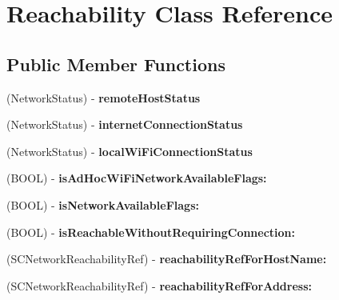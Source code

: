 \hypertarget{interface_reachability}{
\section{Reachability Class Reference}
\label{interface_reachability}
}
\subsection*{Public Member Functions}
\begin{DoxyCompactItemize}
\item 
\hypertarget{interface_reachability_a6ecc8d99fb8ac6789ea6d16142b74dc2}{
(NetworkStatus) -\/ {\bfseries remoteHostStatus}}
\label{interface_reachability_a6ecc8d99fb8ac6789ea6d16142b74dc2}

\item 
\hypertarget{interface_reachability_ad4d2d27655546f497674c0482fcdf2a2}{
(NetworkStatus) -\/ {\bfseries internetConnectionStatus}}
\label{interface_reachability_ad4d2d27655546f497674c0482fcdf2a2}

\item 
\hypertarget{interface_reachability_aac00857972589ed142e782f18b6cc676}{
(NetworkStatus) -\/ {\bfseries localWiFiConnectionStatus}}
\label{interface_reachability_aac00857972589ed142e782f18b6cc676}

\item 
\hypertarget{interface_reachability_a4feb6e656192790a0d940cf77f72033e}{
(BOOL) -\/ {\bfseries isAdHocWiFiNetworkAvailableFlags:}}
\label{interface_reachability_a4feb6e656192790a0d940cf77f72033e}

\item 
\hypertarget{interface_reachability_ac9193b581d1ce2ddbbf963128801c62f}{
(BOOL) -\/ {\bfseries isNetworkAvailableFlags:}}
\label{interface_reachability_ac9193b581d1ce2ddbbf963128801c62f}

\item 
\hypertarget{interface_reachability_a4e1737634c04c4e68c8b47d779a51be8}{
(BOOL) -\/ {\bfseries isReachableWithoutRequiringConnection:}}
\label{interface_reachability_a4e1737634c04c4e68c8b47d779a51be8}

\item 
\hypertarget{interface_reachability_ada171d5d04316dc8dab6ad0eb98f0406}{
(SCNetworkReachabilityRef) -\/ {\bfseries reachabilityRefForHostName:}}
\label{interface_reachability_ada171d5d04316dc8dab6ad0eb98f0406}

\item 
\hypertarget{interface_reachability_a549133dd525c737cceceedc5048a4325}{
(SCNetworkReachabilityRef) -\/ {\bfseries reachabilityRefForAddress:}}
\label{interface_reachability_a549133dd525c737cceceedc5048a4325}


\end{DoxyCompactItemize}

